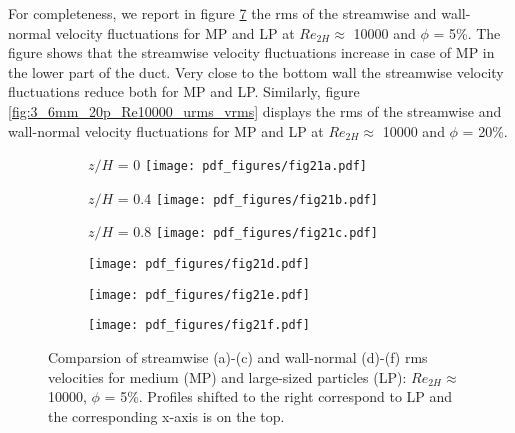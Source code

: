 \documentclass{jfm}
\begin{document}
For completeness, we report in figure \ref{fig:3_6mm_5p_Re10000_urms_vrms} the rms of the streamwise and wall-normal velocity fluctuations for MP and LP at $Re_{2H}\approx$ 10000 and $\phi$ = 5\%. The figure shows that the streamwise velocity fluctuations increase in case of MP in the lower part of the duct. Very close to the bottom wall the streamwise velocity fluctuations reduce both for MP and LP.
Similarly, figure \ref{fig:3_6mm_20p_Re10000_urms_vrms} displays the rms of the streamwise and wall-normal velocity fluctuations for MP and LP at $Re_{2H}\approx$ 10000 and $\phi$ = 20\%. 

\clearpage

\begin{figure}
\centering

\begin{subfigure}{.24\textwidth}
  \centering
  $z/H$ = 0
  \texttt{[image: pdf\_figures/fig21a.pdf]}
  \caption{}
  \label{fig:3_6mm_5p_Re10000_sp00mm_urms}
\end{subfigure}%
\begin{subfigure}{.24\textwidth}
  \centering
  $z/H$ = 0.4
  \texttt{[image: pdf\_figures/fig21b.pdf]}
  \caption{}
  \label{fig:3_6mm_5p_Re10000_sp10mm_urms}
\end{subfigure}
\begin{subfigure}{.24\textwidth}
  \centering
  $z/H$ = 0.8
  \texttt{[image: pdf\_figures/fig21c.pdf]}
  \caption{}
  \label{fig:3_6mm_5p_Re10000_sp20mm_urms}
\end{subfigure}

\begin{subfigure}{.24\textwidth}
  \centering
  \texttt{[image: pdf\_figures/fig21d.pdf]}
  \caption{}
  \label{fig:3_6mm_5p_Re10000_sp00mm_vrms}
\end{subfigure}%
\begin{subfigure}{.24\textwidth}
  \centering
  \texttt{[image: pdf\_figures/fig21e.pdf]}
  \caption{}
  \label{fig:3_6mm_5p_Re10000_sp10mm_vrms}
\end{subfigure}
\begin{subfigure}{.24\textwidth}
  \centering
  \texttt{[image: pdf\_figures/fig21f.pdf]}
  \caption{}
  \label{fig:3_6mm_5p_Re10000_sp20mm_vrms}
\end{subfigure}
\caption{Comparsion of streamwise (a)-(c) and wall-normal (d)-(f) rms velocities for medium (MP) and large-sized particles (LP): $Re_{2H}\approx$ 10000, $\phi$ = 5\%. Profiles shifted to the right correspond to LP and the corresponding x-axis is on the top.}
\label{fig:3_6mm_5p_Re10000_urms_vrms}
\end{figure}
\end{document}
